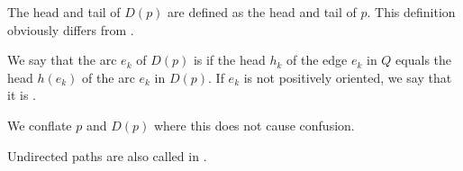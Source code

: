 \begin{definition}
\begin{thmenum}
    The head and tail of \( D(p) \) are defined as the head and tail of \( p \). This definition obviously differs from .

    We say that the arc \( e_k \) of \( D(p) \) is  if the head \( h_k \) of the edge \( e_k \) in \( Q \) equals the head \( h(e_k) \) of the arc \( e_k \) in \( D(p) \). If \( e_k \) is not positively oriented, we say that it is .

    We conflate \( p \) and \( D(p) \) where this does not cause confusion.

    Undirected paths are also called  in \cite[ch. 1, sec. 3.2]{GondranMinoux1984Graphs}.
  \end{thmenum}
\end{definition}

